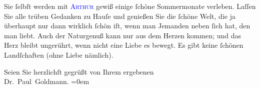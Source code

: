 \pstart
           Sie ſelbſt werden mit \textsc{\textcolor{blue}{Arthur}{}\ledrightnote{}} gewiß einige ſchöne {\pb}Sommermonate verleben.
               Laſſen Sie alle trüben Gedanken zu Hauſe und genießen Sie die ſchöne Welt, die ja
               überhaupt nur dann wirklich ſchön iſt, wenn man Jemanden neben ſich hat, den man \strikeout{\textcolor{gray}{l}} liebt. Auch der Naturgenuß kann nur aus dem Herzen kommen; und das Herz bleibt
               ungerührt, wenn nicht eine Liebe es bewegt. Es gibt keine ſchönen Landſchaften (ohne
               Liebe nämlich).\pend
           
\pstart
           Seien Sie herzlichſt gegrüßt von Ihrem ergebenen {\\[\baselineskip]}\spacefill\mbox{Dr. Paul Goldmann.}\pend
           \leftskip=0em{}\endnumbering{}  
      